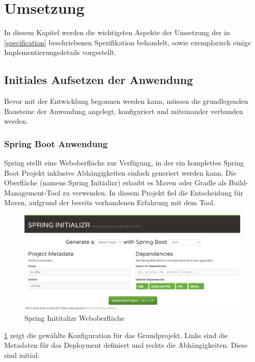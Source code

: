 \cleardoublepage
\section{Umsetzung} \thispagestyle{nomarkstyle}
In diesem Kapitel werden die wichtigsten Aspekte der Umsetzung der in \cref{specification} beschriebenen Spezifikation behandelt, sowie exemplarisch einige Implementierungsdetails vorgestellt.
 
\subsection{Initiales Aufsetzen der Anwendung}
Bevor mit der Entwicklung begonnen werden kann, müssen die grundlegenden Bausteine der Anwendung angelegt, konfiguriert und miteinander verbunden werden.

\subsubsection{Spring Boot Anwendung}\label{spring-boot-init}
Spring stellt eine Weboberfläche zur Verfügung, in der ein komplettes Spring Boot Projekt inklusive Abhängigkeiten einfach generiert werden kann.
Die Oberfläche (namens Spring Initializr) erlaubt es Maven oder Gradle als Build-Management-Tool zu verwenden.
In diesem Projekt fiel die Entscheidung für Maven, aufgrund der bereits vorhandenen Erfahrung mit dem Tool.

\begin{figure}[th!]
	\centering
	\includegraphics[width=\linewidth]{bilder/kap7/Spring-Initializr}
	\caption{Spring Inititalizr Weboberfläche}
	\label{fig:spring-initializr}
\end{figure}

\cref{fig:spring-initializr} zeigt die gewählte Konfiguration für das Grundprojekt. Links sind die Metadaten für das Deployment definiert und rechts die Abhängigkeiten. Diese sind initial:

